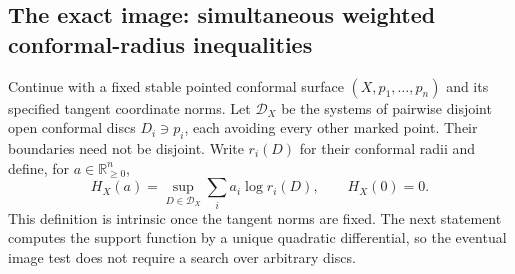 \subsection{The exact image: simultaneous weighted conformal-radius inequalities}
\label{C:A2b-image-section}

Continue with a fixed stable pointed conformal surface $(X,p_1,\ldots,p_n)$ and its specified tangent coordinate norms. Let $\mathcal D_X$ be the systems of pairwise disjoint open conformal discs $D_i\ni p_i$, each avoiding every other marked point. Their boundaries need not be disjoint. Write $r_i(D)$ for their conformal radii and define, for $a\in\mathbb R_{\geq0}^n$,
\[
 H_X(a)=\sup_{D\in\mathcal D_X}\sum_i a_i\log r_i(D),\qquad H_X(0)=0.
\]
This definition is intrinsic once the tangent norms are fixed. The next statement computes the support function by a unique quadratic differential, so the eventual image test does not require a search over arbitrary discs.

